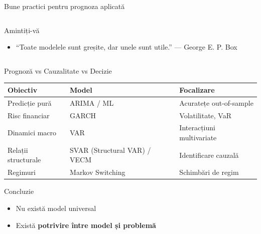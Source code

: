 \documentclass[9pt, aspectratio=169, t]{beamer}
\begin{document}
\begin{frame}{Bune practici pentru prognoza aplicată}
\begin{columns}[T]
        \vspace{0.1cm}

        \begin{block}{Amintiți-vă}
            \begin{itemize}\setlength{\itemsep}{0pt}
                \item ``Toate modelele sunt greșite, dar unele sunt utile.'' \hfill --- George E. P. Box
            \end{itemize}
        \end{block}
    \end{columns}
\end{frame}


\begin{frame}{Prognoză vs Cauzalitate vs Decizie}
    \begin{center}
    \footnotesize
    \begin{tabular}{lll}
        \toprule
        \textbf{Obiectiv} & \textbf{Model} & \textbf{Focalizare} \\
        \midrule
        Predicție pură & ARIMA / ML & Acuratețe out-of-sample \\
        Risc financiar & GARCH & Volatilitate, VaR \\
        Dinamici macro & VAR & Interacțiuni multivariate \\
        Relații structurale & SVAR (Structural VAR) / VECM & Identificare cauzală \\
        Regimuri & Markov Switching & Schimbări de regim \\
        \bottomrule
    \end{tabular}
    \end{center}

    \vspace{0.3cm}

    \begin{alertblock}{Concluzie}
        \begin{itemize}\setlength{\itemsep}{0pt}
            \item Nu există model universal
            \item Există \textbf{potrivire între model și problemă}
        \end{itemize}
    \end{alertblock}
\end{frame}
\end{document}
